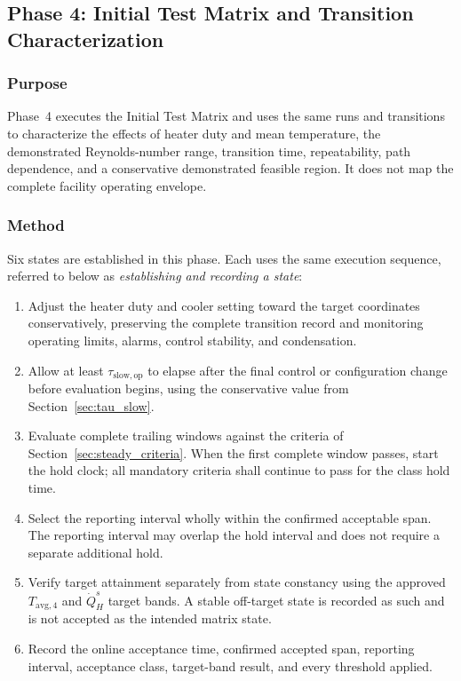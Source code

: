 \documentclass[11pt]{article}
\newcommand{\Tavg}{T_{\mathrm{avg},4}}
\newcommand{\QHs}{\dot Q_{H}^{s}}
\begin{document}
\subsection{Phase 4: Initial Test Matrix and Transition Characterization}
\label{sec:initial_matrix}

\subsubsection{Purpose}

Phase~4 executes the Initial Test Matrix and uses the same runs and transitions to characterize the effects of heater duty and mean temperature, the demonstrated Reynolds-number range, transition time, repeatability, path dependence, and a conservative demonstrated feasible region. It does not map the complete facility operating envelope.

\subsubsection{Method}

Six states are established in this phase. Each uses the same execution sequence, referred to below as \emph{establishing and recording a state}:

\begin{enumerate}[label=(\alph*),leftmargin=1.9em,itemsep=2pt,topsep=3pt]
    \item Adjust the heater duty and cooler setting toward the target coordinates conservatively, preserving the complete transition record and monitoring operating limits, alarms, control stability, and condensation.
    \item Allow at least $\tau_{\mathrm{slow,op}}$ to elapse after the final control or configuration change before evaluation begins, using the conservative value from Section~\ref{sec:tau_slow}.
    \item Evaluate complete trailing windows against the criteria of Section~\ref{sec:steady_criteria}. When the first complete window passes, start the hold clock; all mandatory criteria shall continue to pass for the class hold time.
    \item Select the reporting interval wholly within the confirmed acceptable span. The reporting interval may overlap the hold interval and does not require a separate additional hold.
    \item Verify target attainment separately from state constancy using the approved $\Tavg$ and $\QHs$ target bands. A stable off-target state is recorded as such and is not accepted as the intended matrix state.
    \item Record the online acceptance time, confirmed accepted span, reporting interval, acceptance class, target-band result, and every threshold applied.
\end{enumerate}
\end{document}
